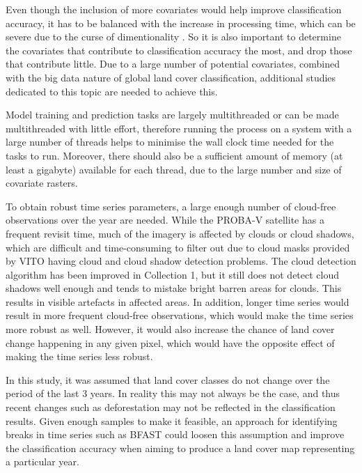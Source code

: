 \documentclass[a4paper,12pt]{scrbook}
\begin{document}
Even though the inclusion of more covariates would help improve classification accuracy, it has to be balanced with the increase in processing time, which can be severe due to the curse of dimentionality \citep{Pelletier2016hardrf}. So it is also important to determine the covariates that contribute to classification accuracy the most, and drop those that contribute little. Due to a large number of potential covariates, combined with the big data nature of global land cover classification, additional studies dedicated to this topic are needed to achieve this.

Model training and prediction tasks are largely multithreaded or can be made multithreaded with little effort, therefore running the process on a system with a large number of threads helps to minimise the wall clock time needed for the tasks to run. Moreover, there should also be a sufficient amount of memory (at least a gigabyte) available for each thread, due to the large number and size of covariate rasters.

To obtain robust time series parameters, a large enough number of cloud-free observations over the year are needed. While the PROBA-V satellite has a frequent revisit time, much of the imagery is affected by clouds or cloud shadows, which are difficult and time-consuming to filter out due to cloud masks provided by VITO having cloud and cloud shadow detection problems. The cloud detection algorithm has been improved in Collection 1, but it still does not detect cloud shadows well enough and tends to mistake bright barren areas for clouds. This results in visible artefacts in affected areas. In addition, longer time series would result in more frequent cloud-free observations, which would make the time series more robust as well. However, it would also increase the chance of land cover change happening in any given pixel, which would have the opposite effect of making the time series less robust.

In this study, it was assumed that land cover classes do not change over the period of the last 3 years. In reality this may not always be the case, and thus recent changes such as deforestation may not be reflected in the classification results. Given enough samples to make it feasible, an approach for identifying breaks in time series such as BFAST \citep{Verbesselt2010bfast} could loosen this assumption and improve the classification accuracy when aiming to produce a land cover map representing a particular year.
\end{document}

